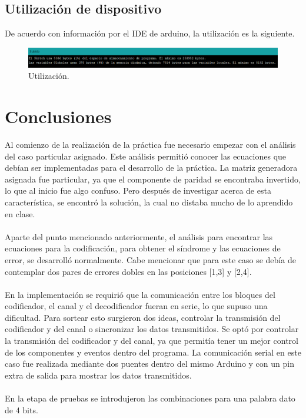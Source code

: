 \documentclass[12pt,letterpaper]{article}
\begin{document}
\newpage
\subsection{Utilización de dispositivo}
De acuerdo con información por el IDE de arduino, la utilización es la siguiente.
\begin{figure}[ht]
    \centering
    \includegraphics[width=1\textwidth]{uti.png}
    \caption{Utilización.}
\end{figure}

\section{Conclusiones}
Al comienzo de la realización de la práctica fue necesario empezar con el análisis del caso particular 
asignado. Este análisis permitió conocer las ecuaciones que debían ser implementadas para el desarrollo 
de la práctica. La matriz generadora asignada fue particular, ya que el componente de paridad se 
encontraba invertido, lo que al inicio fue algo confuso. Pero después de investigar acerca de esta 
característica, se encontró la solución, la cual no distaba mucho de lo aprendido en clase.
\\ \\
Aparte del punto mencionado anteriormente, el análisis para encontrar las ecuaciones para la 
codificación, para obtener el síndrome y las ecuaciones de error, se desarrolló normalmente. 
Cabe mencionar que para este caso se debía de contemplar dos pares de errores dobles en las posiciones 
[1,3] y [2,4]. 
\\ \\
En la implementación se requirió que la comunicación entre los bloques del codificador, el canal 
y el decodificador fueran en serie, lo que supuso una dificultad. Para sortear esto surgieron dos 
ideas, controlar la transmisión del codificador y del canal o sincronizar los datos transmitidos. 
Se optó por controlar la transmisión del codificador y del canal, ya que permitía tener un mejor 
control de los componentes y eventos dentro del programa. La comunicación serial en este caso fue 
realizada mediante dos puentes dentro del mismo Arduino y con un pin extra de salida para mostrar 
los datos transmitidos.
\\ \\
En la etapa de pruebas se introdujeron las combinaciones para una palabra dato de 4 bits. 
\end{document}
